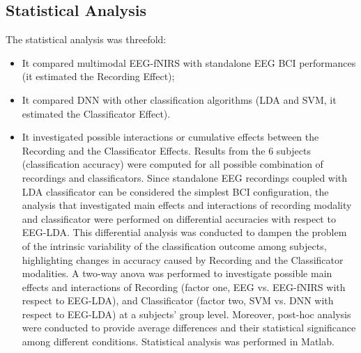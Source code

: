 \documentclass[12pt ]{iopart}
\begin{document}
\subsection{Statistical Analysis}

The statistical analysis was threefold:
\begin{itemize}
\item It compared multimodal EEG-fNIRS with standalone EEG  BCI performances (it estimated the Recording Effect);
\item It compared DNN with other classification  algorithms (LDA and SVM, it estimated the Classificator Effect).
\item It investigated possible interactions or cumulative effects between the Recording and the Classificator Effects.
Results from the 6 subjects (classification accuracy) were computed for all possible combination of recordings and classificators. 
Since standalone EEG recordings coupled with LDA classificator can be considered the simplest BCI configuration, the analysis that investigated main effects and interactions of recording modality and classificator were performed on differential accuracies with respect to EEG-LDA.
This differential analysis was conducted to dampen the problem of the intrinsic variability of  the classification outcome among subjects, highlighting changes in accuracy caused by  Recording and the Classificator modalities.
A two-way anova was performed to investigate possible main effects and interactions of Recording  (factor one, EEG vs. EEG-fNIRS with respect to EEG-LDA), and  Classificator (factor two, SVM vs. DNN with respect to EEG-LDA) at a subjects' group level.
Moreover, post-hoc analysis were conducted to provide average differences and their statistical significance among different conditions.
Statistical analysis was performed in Matlab.
\end{itemize} 
\end{document}
